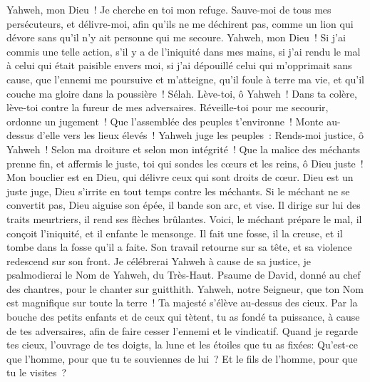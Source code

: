 \begin{multicols}{2}
Yahweh, mon Dieu~! Je cherche en toi mon refuge. Sauve-moi de tous mes persécuteurs, et délivre-moi,
afin qu'ils ne me déchirent pas, comme un lion qui dévore sans qu'il n'y ait personne qui me secoure.
Yahweh, mon Dieu~! Si j'ai commis une telle action, s'il y a de l'iniquité dans mes mains,
si j'ai rendu le mal à celui qui était paisible envers moi, si j'ai dépouillé celui qui m'opprimait sans cause,
que l'ennemi me poursuive et m'atteigne, qu'il foule à terre ma vie, et qu'il couche ma gloire dans la poussière~! Sélah.
Lève-toi, ô Yahweh~! Dans ta colère, lève-toi contre la fureur de mes adversaires. Réveille-toi pour me secourir, ordonne un jugement~!
Que l'assemblée des peuples t'environne~! Monte au-dessus d'elle vers les lieux élevés~!
Yahweh juge les peuples~: Rends-moi justice, ô Yahweh~! Selon ma droiture et selon mon intégrité~!
Que la malice des méchants prenne fin, et affermis le juste, toi qui sondes les cœurs et les reins, ô Dieu juste~!
Mon bouclier est en Dieu, qui délivre ceux qui sont droits de cœur.
Dieu est un juste juge, Dieu s'irrite en tout temps contre les méchants.
Si le méchant ne se convertit pas, Dieu aiguise son épée, il bande son arc, et vise.
Il dirige sur lui des traits meurtriers, il rend ses flèches brûlantes.
Voici, le méchant prépare le mal, il conçoit l'iniquité, et il enfante le mensonge.
Il fait une fosse, il la creuse, et il tombe dans la fosse qu'il a faite.
Son travail retourne sur sa tête, et sa violence redescend sur son front.
Je célébrerai Yahweh à cause de sa justice, je psalmodierai le Nom de Yahweh, du Très-Haut.
\VerseOne{}Psaume de David, donné au chef des chantres, pour le chanter sur guitthith.
Yahweh, notre Seigneur, que ton Nom est magnifique sur toute la terre~! Ta majesté s'élève au-dessus des cieux.
Par la bouche des petits enfants et de ceux qui tètent, tu as fondé ta puissance, à cause de tes adversaires, afin de faire cesser l'ennemi et le vindicatif.
Quand je regarde tes cieux, l'ouvrage de tes doigts, la lune et les étoiles que tu as fixées:
Qu'est-ce que l'homme, pour que tu te souviennes de lui~? Et le fils de l'homme, pour que tu le visites~?

\end{multicols}
